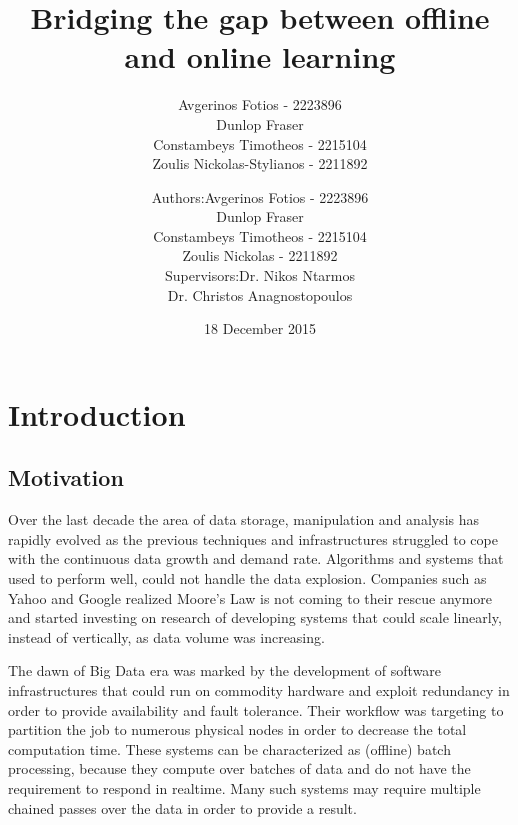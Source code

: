 \documentclass{lmproj}
\begin{document}
\title{Bridging the gap between offline and online learning}
\author{Avgerinos Fotios - 2223896\\
        Dunlop Fraser \\
        Constambeys Timotheos - 2215104\\
        Zoulis Nickolas-Stylianos - 2211892}
    
\author{\begin{tabular}{r@{ }l} 
		Authors:      & Avgerinos Fotios - 2223896\\
		& Dunlop Fraser \\
		& Constambeys Timotheos - 2215104\\
		& Zoulis Nickolas - 2211892\\[1ex] 
		Supervisors: & Dr. Nikos Ntarmos\\
		& Dr. Christos Anagnostopoulos
	\end{tabular}}    
    
\date{18 December 2015}
\maketitle

\tableofcontents
\chapter{Introduction}
\label{intro}

\section{Motivation}
\label{intro}

Over the last decade the area of data storage, manipulation and analysis has rapidly evolved as the previous techniques and infrastructures struggled to cope with the continuous data growth and demand rate. Algorithms and systems that used to perform well, could not handle the data explosion. Companies such as Yahoo and Google realized Moore's Law is not coming to their rescue anymore and started investing on research of developing systems that could scale linearly, instead of vertically, as data volume was increasing. 

The dawn of Big Data era was marked by the development of software infrastructures that could run on commodity hardware and exploit redundancy in order to provide availability and fault tolerance. Their workflow was targeting to partition the job to numerous physical nodes in order to decrease the total computation time. These systems can be characterized as (offline) batch processing, because they compute over batches of data and do not have the requirement to respond in realtime. Many such systems may require multiple chained passes over the data in order to provide a result.
\end{document}
